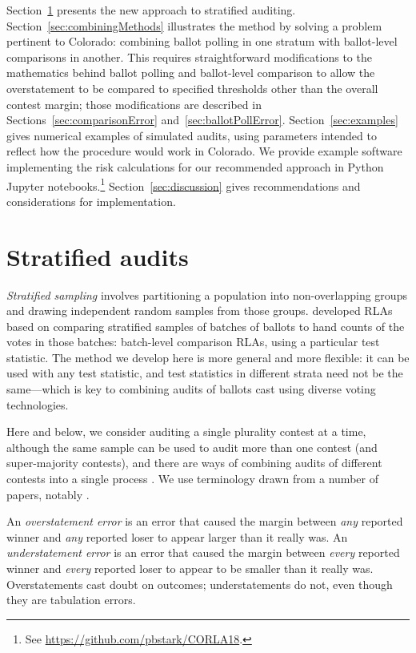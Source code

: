 \documentclass[runningheads]{llncs}
\begin{document}
Section~\ref{sec:stratified} presents the new approach to stratified auditing.
Section~\ref{sec:combiningMethods} illustrates the method by solving a problem pertinent to Colorado:
combining ballot polling in one stratum with ballot-level comparisons in another.
This requires straightforward modifications to the mathematics behind ballot polling and ballot-level comparison to allow the overstatement to be compared to specified thresholds other than the overall contest margin; those modifications are described in Sections~\ref{sec:comparisonError} and~\ref{sec:ballotPollError}.
Section~\ref{sec:examples} gives numerical examples of simulated audits, using parameters intended to reflect how the procedure would work in Colorado.
We provide example software implementing the risk calculations for
our recommended approach in Python Jupyter notebooks.\footnote{%
 See \url{https://github.com/pbstark/CORLA18}.
}
Section~\ref{sec:discussion} gives recommendations and
considerations for implementation.

\section{Stratified audits} \label{sec:stratified}

\emph{Stratified sampling} involves partitioning a population
into non-overlapping groups and drawing independent random samples from those groups.
\cite{stark08a,higginsEtal11} developed RLAs based on comparing stratified samples of batches of ballots to hand counts of the votes in those batches: batch-level comparison RLAs, using a particular test statistic.
The method we develop here is more general and more flexible: it can be used with any test statistic, and test statistics in different strata need not be the same---which is key to combining audits of ballots cast using diverse voting technologies.

Here and below, we consider auditing a single plurality contest at a time, although the same sample can be used to audit more than one contest (and super-majority contests), and there are ways of combining audits of different contests into a single process \cite{stark09c,stark10d}.
We use terminology drawn from a number of papers, notably \cite{lindemanStark12}.

An \emph{overstatement error} is an error that caused the margin between \emph{any} reported
winner and \emph{any} reported loser to appear larger than it really was.
An \emph{understatement error} is an error that caused the margin between \emph{every} reported
winner and \emph{every} reported loser to appear to be smaller than it really was.
Overstatements cast doubt on outcomes; understatements do not, even though they are tabulation errors.
\end{document}
